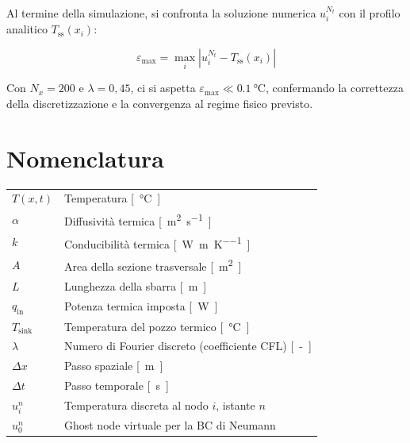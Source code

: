 \documentclass[11pt, a4paper]{article}
\begin{document}
Al termine della simulazione, si confronta la soluzione numerica $u_i^{N_t}$ con il profilo analitico $T_\text{ss}(x_i)$:

\begin{equation}
  \varepsilon_\text{max} = \max_{i} \left| u_i^{N_t} - T_\text{ss}(x_i) \right|
\end{equation}

Con $N_x = 200$ e $\lambda = 0{,}45$, ci si aspetta $\varepsilon_\text{max} \ll \SI{0.1}{\celsius}$, confermando la correttezza della discretizzazione e la convergenza al regime fisico previsto.

\appendix
\section{Nomenclatura}

\begin{tabular}{>{\bfseries}ll}
$T(x,t)$         & Temperatura \si{[\celsius]}\\
$\alpha$         & Diffusività termica \si{[\meter\squared\per\second]}\\
$k$              & Conducibilità termica \si{[\watt\per\meter\per\kelvin]}\\
$A$              & Area della sezione trasversale \si{[\meter\squared]}\\
$L$              & Lunghezza della sbarra \si{[\meter]}\\
$q_\text{in}$    & Potenza termica imposta \si{[\watt]}\\
$T_\text{sink}$  & Temperatura del pozzo termico \si{[\celsius]}\\
$\lambda$        & Numero di Fourier discreto (coefficiente CFL) \si{[-]}\\
$\Delta x$       & Passo spaziale \si{[\meter]}\\
$\Delta t$       & Passo temporale \si{[\second]}\\
$u_i^n$          & Temperatura discreta al nodo $i$, istante $n$\\
$u_0^n$          & Ghost node virtuale per la BC di Neumann\\
\end{tabular}
\end{document}
